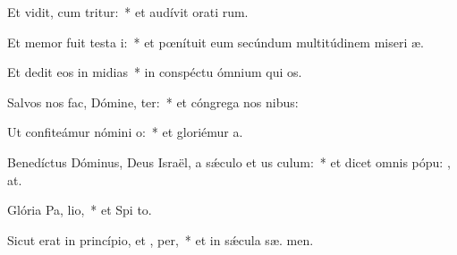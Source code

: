 \item Et vidit, cum tritur:~* et audívit orati rum.
\item Et memor fuit testa i:~* et pœnítuit eum secúndum multitúdinem miseri æ.
\item Et dedit eos in midias~* in conspéctu ómnium qui  os.
\item Salvos nos fac, Dómine,  ter:~* et cóngrega nos  nibus:
\item Ut confiteámur nómini  o:~* et gloriémur   a.
\item Benedíctus Dóminus, Deus Israël, a sǽculo et us  culum:~* et dicet omnis pópu: , at.
\item Glória Pa,  lio,~* et Spi to.
\item Sicut erat in princípio, et ,  per,~* et in sǽcula sæ. men.
